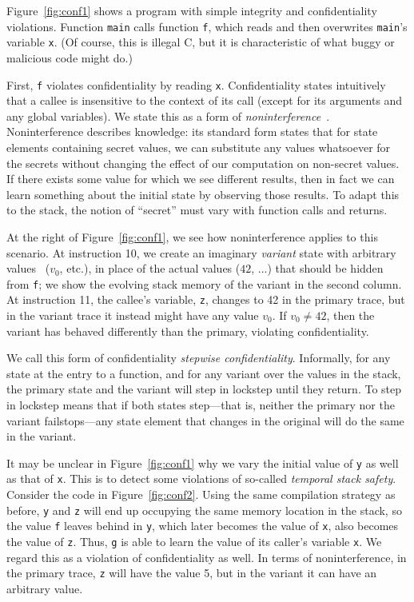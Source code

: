 \documentclass[10pt,conference]{ieeetran}%
\theoremstyle{definition}
\begin{document}
Figure~\ref{fig:conf1} shows a program with simple integrity and confidentiality violations. Function {\tt main}
calls function {\tt f}, which reads and then overwrites {\tt main}'s
variable {\tt x}. (Of course, this is illegal C, but it is characteristic of what buggy or malicious code might do.)

First, {\tt f} violates confidentiality by reading {\tt x}.
Confidentiality states intuitively that a callee is insensitive to
the context of its call (except for its arguments and any global
variables).
We state this as a form of {\em noninterference}~\cite{Goguen1982SecurityPA}.
Noninterference describes knowledge: its standard form states that for state elements
containing secret values, we can substitute any values whatsoever for the secrets
without changing the effect of our computation on non-secret values.
%
If there exists some value for which we see different results, then
in fact we can learn something about the initial state by observing those results.
To adapt this to the stack, the notion of ``secret'' must vary with function
calls and returns.

At the right of Figure~\ref{fig:conf1}, we see how noninterference applies to this scenario.
At instruction 10, we
create an imaginary {\em variant}
state with arbitrary values~%
(\(v_0\), etc.),
in place of the actual values ($42$, ...) that should
be hidden from {\tt f}; we show the evolving stack memory of the variant in the second column.
At instruction 11, the callee's variable, {\tt z},
changes to 42 in the primary trace, but
in the variant trace it instead might have any value \(v_0\). If \(v_0 \neq 42\), then the variant
has behaved differently than the primary, violating confidentiality.

We call this form of confidentiality {\em stepwise confidentiality}. Informally,
for any state at the entry to a function, and for any variant over the values in the stack,
the primary state and the variant will step in lockstep until they
return. To step in lockstep
means that if both states step---that is, neither the primary nor the variant failstops---any
state element that changes in the original will do the same in the variant.

It may be unclear in Figure~\ref{fig:conf1} why we vary the initial value of {\tt y}
as well as that of {\tt x}. This is to detect some violations of so-called
{\em temporal stack safety}.
Consider the code in Figure~\ref{fig:conf2}.
Using the same compilation strategy as before, {\tt y} and {\tt z} will end up occupying the
same memory location in the stack,
so the value {\tt f} leaves behind in {\tt y}, which later becomes the value of {\tt x}, also
becomes the value of {\tt z}. Thus, {\tt g} is able to learn the value of its caller's
variable {\tt x}.  We regard this as a violation of confidentiality as well. In terms of noninterference,
in the primary trace, {\tt z} will have the value 5, but in the variant it can have
an arbitrary value.
\end{document}
